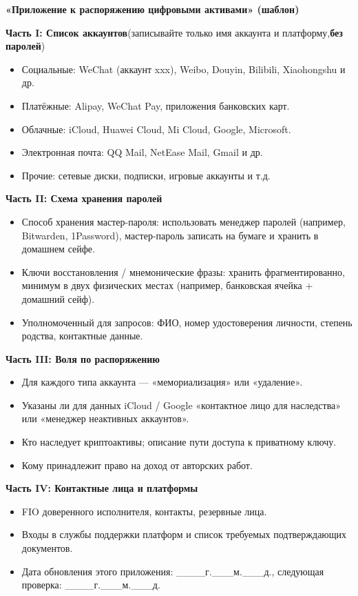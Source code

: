 \textbf{«Приложение к распоряжению цифровыми активами» (шаблон)}\par

\textbf{Часть I: Список аккаунтов}(записывайте только имя аккаунта и платформу,\textbf{без паролей})

\begin{itemize}
  \item Социальные: WeChat (аккаунт xxx), Weibo, Douyin, Bilibili, Xiaohongshu и др.
  \item Платёжные: Alipay, WeChat Pay, приложения банковских карт.
  \item Облачные: iCloud, Huawei Cloud, Mi Cloud, Google, Microsoft.
  \item Электронная почта: QQ Mail, NetEase Mail, Gmail и др.
  \item Прочие: сетевые диски, подписки, игровые аккаунты и т.д.
\end{itemize}

\textbf{Часть II: Схема хранения паролей}

\begin{itemize}
  \item Способ хранения мастер-пароля: использовать менеджер паролей (например, Bitwarden, 1Password), мастер-пароль записать на бумаге и хранить в домашнем сейфе.
  \item Ключи восстановления / мнемонические фразы: хранить фрагментированно, минимум в двух физических местах (например, банковская ячейка + домашний сейф).
  \item Уполномоченный для запросов: ФИО, номер удостоверения личности, степень родства, контактные данные.
\end{itemize}

\textbf{Часть III: Воля по распоряжению}

\begin{itemize}
  \item Для каждого типа аккаунта — «мемориализация» или «удаление».
  \item Указаны ли для данных iCloud / Google «контактное лицо для наследства» или «менеджер неактивных аккаунтов».
  \item Кто наследует криптоактивы; описание пути доступа к приватному ключу.
  \item Кому принадлежит право на доход от авторских работ.
\end{itemize}

\textbf{Часть IV: Контактные лица и платформы}

\begin{itemize}
  \item FIO доверенного исполнителя, контакты, резервные лица.
  \item Входы в службы поддержки платформ и список требуемых подтверждающих документов.
  \item Дата обновления этого приложения: \_\_\_\_г.\_\_\_м.\_\_\_д., следующая проверка: \_\_\_\_г.\_\_\_м.\_\_\_д.
\end{itemize}

